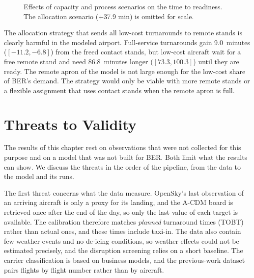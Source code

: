 \begin{figure}[htbp]
\centering
{}
\caption{Effects of capacity and process scenarios on the time to readiness. The allocation scenario (+37.9 min) is omitted for scale.}
\label{fig:whatif}
\end{figure}

The allocation strategy that sends all low-cost turnarounds to remote stands is clearly harmful in the modeled airport. Full-service turnarounds gain 9.0~minutes ($[-11.2,-6.8]$) from the freed contact stands, but low-cost aircraft wait for a free remote stand and need 86.8~minutes longer ($[73.3,100.3]$) until they are ready. The remote apron of the model is not large enough for the low-cost share of BER's demand. The strategy would only be viable with more remote stands or a flexible assignment that uses contact stands when the remote apron is full.

\section{Threats to Validity}
\label{sec:threats}

The results of this chapter rest on observations that were not collected for this purpose and on a model that was not built for BER. Both limit what the results can show. We discuss the threats in the order of the pipeline, from the data to the model and its runs.

The first threat concerns what the data measure. OpenSky's last observation of an arriving aircraft is only a proxy for its landing, and the A-CDM board is retrieved once after the end of the day, so only the last value of each target is available. The calibration therefore matches \emph{planned} turnaround times (TOBT) rather than actual ones, and these times include taxi-in. The data also contain few weather events and no de-icing conditions, so weather effects could not be estimated precisely, and the disruption screening relies on a short baseline. The carrier classification is based on business models, and the previous-work dataset pairs flights by flight number rather than by aircraft.

